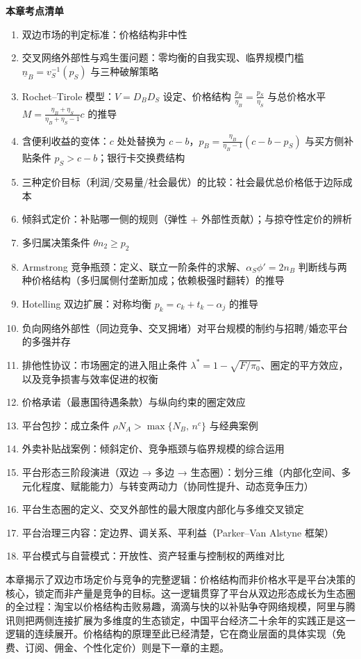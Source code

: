 \begin{chapterbox}
\textbf{本章考点清单}

\begin{enumerate}
\item 双边市场的判定标准：价格结构非中性 
\item 交叉网络外部性与鸡生蛋问题：零均衡的自我实现、临界规模门槛 $\underline{n}_B = v_S^{-1}(p_S)$ 与三种破解策略 
\item Rochet–Tirole 模型：$V = D_BD_S$ 设定、价格结构 $\frac{p_B}{\eta_B} = \frac{p_S}{\eta_S}$ 与总价格水平 $M = \frac{\eta_B+\eta_S}{\eta_B+\eta_S-1}c$ 的推导 
\item 含便利收益的变体：$c$ 处处替换为 $c-b$，$p_B = \frac{\eta_B}{\eta_B-1}(c-b-p_S)$ 与买方侧补贴条件 $p_S > c-b$；银行卡交换费结构 
\item 三种定价目标（利润/交易量/社会最优）的比较：社会最优总价格低于边际成本 
\item 倾斜式定价：补贴哪一侧的规则（弹性 + 外部性贡献）；与掠夺性定价的辨析 
\item 多归属决策条件 $\theta n_2 \geq p_2$ 
\item Armstrong 竞争瓶颈：定义、联立一阶条件的求解、$\alpha_S\phi' = 2n_B$ 判断线与两种价格结构（多归属侧付垄断加成；依赖极强时翻转）的推导 
\item Hotelling 双边扩展：对称均衡 $p_k = c_k + t_k - \alpha_j$ 的推导 
\item 负向网络外部性（同边竞争、交叉拥堵）对平台规模的制约与招聘/婚恋平台的多强并存 
\item 排他性协议：市场圈定的进入阻止条件 $\lambda^* = 1-\sqrt{F/\pi_0}$、圈定的平方效应，以及竞争损害与效率促进的权衡 
\item 价格承诺（最惠国待遇条款）与纵向约束的圈定效应 
\item 平台包抄：成立条件 $\rho N_A > \max\{N_B,\,n^c\}$ 与经典案例 
\item 外卖补贴战案例：倾斜定价、竞争瓶颈与临界规模的综合运用 
\item 平台形态三阶段演进（双边 → 多边 → 生态圈）：划分三维（内部化空间、多元化程度、赋能能力）与转变两动力（协同性提升、动态竞争压力）
\item 平台生态圈的定义、交叉外部性的最大限度内部化与多维交叉锁定 
\item 平台治理三内容：定边界、调关系、平利益（Parker–Van Alstyne 框架）
\item 平台模式与自营模式：开放性、资产轻重与控制权的两维对比 
\end{enumerate}
\end{chapterbox}

本章揭示了双边市场定价与竞争的完整逻辑：价格结构而非价格水平是平台决策的核心，锁定而非产量是竞争的目标。这一逻辑贯穿了平台从双边形态成长为生态圈的全过程：淘宝以价格结构击败易趣，滴滴与快的以补贴争夺网络规模，阿里与腾讯则把两侧连接扩展为多维度的生态锁定，中国平台经济二十余年的实践正是这一逻辑的连续展开。价格结构的原理至此已经清楚，它在商业层面的具体实现（免费、订阅、佣金、个性化定价）则是下一章的主题。
